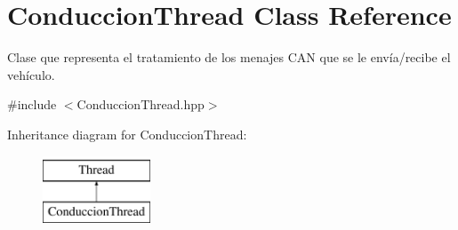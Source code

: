 \hypertarget{class_conduccion_thread}{\section{\-Conduccion\-Thread \-Class \-Reference}
\label{class_conduccion_thread}
}


\-Clase que representa el tratamiento de los menajes \-C\-A\-N que se le envía/recibe el vehículo.  




{\ttfamily \#include $<$\-Conduccion\-Thread.\-hpp$>$}

\-Inheritance diagram for \-Conduccion\-Thread\-:\begin{figure}[H]
\begin{center}
\leavevmode
\includegraphics[height=2.000000cm]{class_conduccion_thread}
\end{center}
\end{figure}
